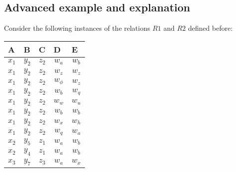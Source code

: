\documentclass{article}
\begin{document}
\subsection*{Advanced example and explanation}

Consider the following instances of the relations $R1$ and $R2$ defined before:
\vskip 0.2in

\parbox{.45\linewidth}{
\begin{center}
  \begin{tabular}{lllll}
  	\hline
    A & B & C & D & E\\
    \hline
    \multicolumn{1}{|c|}{$x_1$} & \multicolumn{1}{c|}{$y_2$} & \multicolumn{1}{c|}{$z_2$} & \multicolumn{1}{c|}{$w_a$} & \multicolumn{1}{c|}{$w_b$}\\ \hline
    \multicolumn{1}{|c|}{$x_1$} & \multicolumn{1}{c|}{$y_2$} & \multicolumn{1}{c|}{$z_2$} & \multicolumn{1}{c|}{$w_z$} & \multicolumn{1}{c|}{$w_z$}\\ \hline
    \multicolumn{1}{|c|}{$x_1$} & \multicolumn{1}{c|}{$y_2$} & \multicolumn{1}{c|}{$z_2$} & \multicolumn{1}{c|}{$w_\phi$} & \multicolumn{1}{c|}{$w_z$}\\ \hline
    \multicolumn{1}{|c|}{$x_1$} & \multicolumn{1}{c|}{$y_2$} & \multicolumn{1}{c|}{$z_2$} & \multicolumn{1}{c|}{$w_b$} & \multicolumn{1}{c|}{$w_q$}\\ \hline
    \multicolumn{1}{|c|}{$x_1$} & \multicolumn{1}{c|}{$y_2$} & \multicolumn{1}{c|}{$z_2$} & \multicolumn{1}{c|}{$w_w$} & \multicolumn{1}{c|}{$w_u$}\\ \hline
    \multicolumn{1}{|c|}{$x_1$} & \multicolumn{1}{c|}{$y_2$} & \multicolumn{1}{c|}{$z_2$} & \multicolumn{1}{c|}{$w_b$} & \multicolumn{1}{c|}{$w_b$}\\ \hline
    \multicolumn{1}{|c|}{$x_1$} & \multicolumn{1}{c|}{$y_2$} & \multicolumn{1}{c|}{$z_2$} & \multicolumn{1}{c|}{$w_x$} & \multicolumn{1}{c|}{$w_h$}\\ \hline
    \multicolumn{1}{|c|}{$x_1$} & \multicolumn{1}{c|}{$y_2$} & \multicolumn{1}{c|}{$z_2$} & \multicolumn{1}{c|}{$w_q$} & \multicolumn{1}{c|}{$w_a$}\\ \hline
	\multicolumn{1}{|c|}{$x_2$} & \multicolumn{1}{c|}{$y_5$} & \multicolumn{1}{c|}{$z_1$} & \multicolumn{1}{c|}{$w_a$} & \multicolumn{1}{c|}{$w_b$}\\ \hline
    \multicolumn{1}{|c|}{$x_2$} & \multicolumn{1}{c|}{$y_4$} & \multicolumn{1}{c|}{$z_1$} & \multicolumn{1}{c|}{$w_a$} & \multicolumn{1}{c|}{$w_b$}\\ \hline
    \multicolumn{1}{|c|}{$x_3$} & \multicolumn{1}{c|}{$y_7$} & \multicolumn{1}{c|}{$z_3$} & \multicolumn{1}{c|}{$w_a$} & \multicolumn{1}{c|}{$w_x$}\\ \hline

\end{tabular}
\end{center}}
\end{document}
